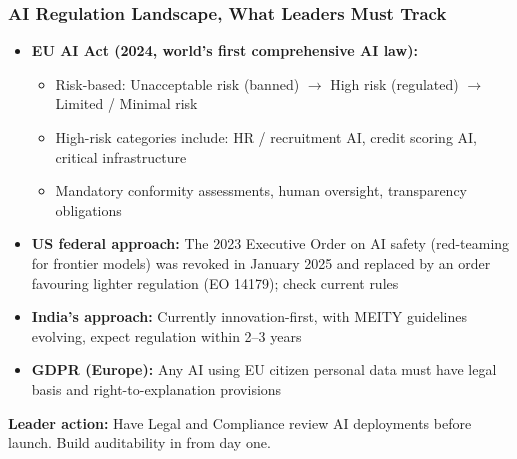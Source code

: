 \begin{frame}[fragile]\frametitle{AI Regulation Landscape, What Leaders Must Track}

\begin{itemize}
  \item \textbf{EU AI Act (2024, world's first comprehensive AI law):}
    \begin{itemize}
      \item Risk-based: Unacceptable risk (banned) $\rightarrow$ High risk (regulated) $\rightarrow$ Limited / Minimal risk
      \item High-risk categories include: HR / recruitment AI, credit scoring AI, critical infrastructure
      \item Mandatory conformity assessments, human oversight, transparency obligations
    \end{itemize}
  \item \textbf{US federal approach:} The 2023 Executive Order on AI safety (red-teaming for frontier models) was revoked in January 2025 and replaced by an order favouring lighter regulation (EO 14179); check current rules
  \item \textbf{India's approach:} Currently innovation-first, with MEITY guidelines evolving, expect regulation within 2--3 years
  \item \textbf{GDPR (Europe):} Any AI using EU citizen personal data must have legal basis and right-to-explanation provisions
\end{itemize}

\textbf{Leader action:} Have Legal and Compliance review AI deployments before launch. Build auditability in from day one.

\end{frame}


